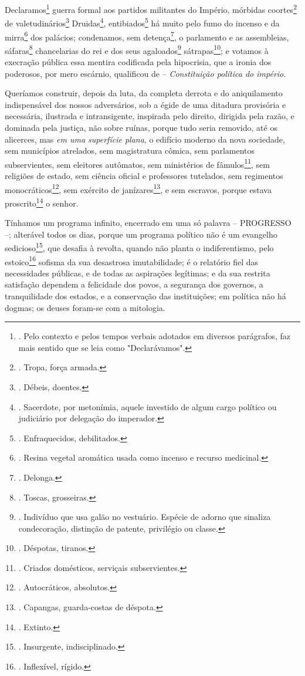Declaramos\footnote{. Pelo contexto e pelos tempos verbais adotados em
  diversos parágrafos, faz mais sentido que se leia como "Declarávamos".}
guerra formal aos partidos militantes do Império, mórbidas
coortes\footnote{. Tropa, força armada.} de valetudinários\footnote{.
  Débeis, doentes.} Druidas\footnote{. Sacerdote, por metonímia, aquele
  investido de algum cargo político ou judiciário por delegação do
  imperador.}, entibiados\footnote{. Enfraquecidos, debilitados.} há
muito pelo fumo do incenso e da mirra\footnote{. Resina vegetal
  aromática usada como incenso e recurso medicinal.} dos palácios;
condenamos, sem detença\footnote{. Delonga.}, o parlamento e as
assembleias, sáfaras\footnote{. Toscas, grosseiras.} chancelarias do rei
e dos seus agaloados\footnote{. Indivíduo que usa galão no vestuário.
  Espécie de adorno que sinaliza condecoração, distinção de patente,
  privilégio ou classe.} sátrapas\footnote{. Déspotas, tiranos.}; e
votamos à execração pública essa mentira codificada pela hipocrisia, que
a ironia dos poderosos, por mero escárnio, qualificou de --
\emph{Constituição política do império}.

Queríamos construir, depois da luta, da completa derrota e do
aniquilamento indispensável dos nossos adversários, sob a égide de uma
ditadura provisória e necessária, ilustrada e intransigente, inspirada
pelo direito, dirigida pela razão, e dominada pela justiça, não sobre
ruínas, porque tudo seria removido, até os alicerces, mas \emph{em uma
superfície plana}, o edifício moderno da nova sociedade, sem municípios
atrelados, sem magistratura cômica, sem parlamentos subservientes, sem
eleitores autômatos, sem ministérios de fâmulos\footnote{. Criados
  domésticos, serviçais subservientes.}, sem religiões de estado, sem
ciência oficial e professores tutelados, sem regimentos
monocráticos\footnote{. Autocráticos, absolutos.}, sem exército de
janízares\footnote{. Capangas, guarda-costas de déspota.}, e sem
escravos, porque estava proscrito\footnote{. Extinto.} o senhor.

Tínhamos um programa infinito, encerrado em uma só palavra -- PROGRESSO
--; alterável todos os dias, porque um programa político não é um
evangelho sedicioso\footnote{. Insurgente, indisciplinado.}, que desafia
à revolta, quando não planta o indiferentismo, pelo estoico\footnote{.
  Inflexível, rígido.} sofisma da sua desastrosa imutabilidade; é o
relatório fiel das necessidades públicas, e de todas as aspirações
legítimas; e da sua restrita satisfação dependem a felicidade dos povos,
a segurança dos governos, a tranquilidade dos estados, e a conservação
das instituições; em política não há dogmas; os deuses foram-se com a
mitologia.

